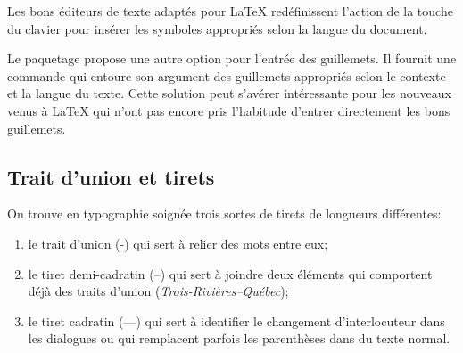 Les bons éditeurs de texte adaptés pour {\LaTeX} redéfinissent
l'action de la touche %
\raisebox{-2pt}{%
  \ooalign{\hfil\Large\faSquareO\hfil\cr\hfil\ttfamily\textquotedbl\hfil}} %
du clavier pour insérer les symboles appropriés selon la langue du
document.

Le paquetage  \citep{csquotes} propose une autre option
pour l'entrée des guillemets. Il fournit une commande
\cmdprint{\enquote} qui entoure son argument des guillemets appropriés
selon le contexte et la langue du texte. Cette solution peut s'avérer
intéressante pour les nouveaux venus à {\LaTeX} qui n'ont pas encore
pris l'habitude d'entrer directement les bons guillemets.

\subsection{Trait d'union et tirets}
\label{sec:bases:caracteres:tirets}

On trouve en typographie soignée trois sortes de tirets de longueurs
différentes:
\begin{enumerate}
\item le trait d'union (-) qui sert à relier des mots entre eux;
\item le tiret demi-cadratin (--) qui sert à joindre deux éléments qui
  comportent déjà des traits d'union (\emph{Trois-Rivières--Québec});
\item le tiret cadratin (---) qui sert à identifier le changement
  d'interlocuteur dans les dialogues ou qui remplacent parfois les
  parenthèses dans du texte normal.
\end{enumerate}

